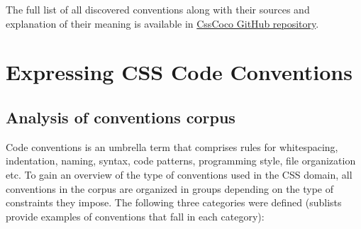 \documentclass[parskip=full]{uvamscse}
\begin{document}
The full list of all discovered conventions along with their sources and explanation of their meaning is available in \href{https://github.com/boryanagoncharenko/CssCoco/blob/master/analysis.md}{CssCoco GitHub repository}.


\chapter{Expressing CSS Code Conventions}
\label{sec:expressing}

\section{Analysis of conventions corpus}

Code conventions is an umbrella term that comprises rules for whitespacing, indentation, naming, syntax, code patterns, programming style, file organization etc. To gain an overview of the type of conventions used in the CSS domain, all conventions in the corpus are organized in groups depending on the type of constraints they impose. The following three categories were defined (sublists provide examples of conventions that fall in each category):
\end{document}

